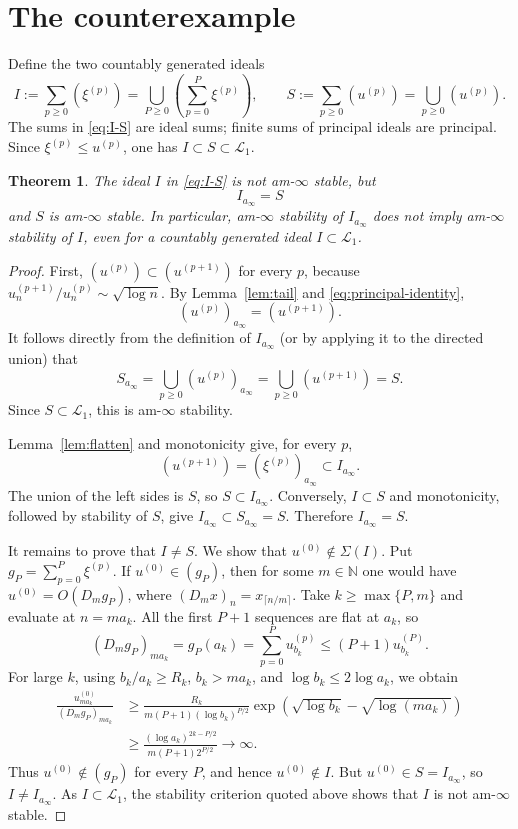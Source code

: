 \documentclass[11pt]{article}
\newtheorem{theorem}{Theorem}
\newcommand{\N}{\mathbb N}
\begin{document}
\section{The counterexample}

Define the two countably generated ideals
\begin{equation}\label{eq:I-S}
 I:=\sum_{p\ge0}(\xi^{(p)})
   =\bigcup_{P\ge0}\left(\sum_{p=0}^{P}\xi^{(p)}\right),
 \qquad
 S:=\sum_{p\ge0}(u^{(p)})=\bigcup_{p\ge0}(u^{(p)}).
\end{equation}
The sums in \eqref{eq:I-S} are ideal sums; finite sums of principal ideals
are principal.  Since $\xi^{(p)}\le u^{(p)}$, one has $I\subset S\subset
\mathcal L_1$.

\begin{theorem}\label{thm:counterexample}
The ideal $I$ in \eqref{eq:I-S} is not am-$\infty$ stable, but
\[
                         I_{a_\infty}=S
\]
and $S$ is am-$\infty$ stable.  In particular, am-$\infty$ stability of
$I_{a_\infty}$ does not imply am-$\infty$ stability of $I$, even for a
countably generated ideal $I\subset\mathcal L_1$.
\end{theorem}

\begin{proof}
First, $(u^{(p)})\subset(u^{(p+1)})$ for every $p$, because
$u^{(p+1)}_n/u^{(p)}_n\sim\sqrt{\log n}$.  By
Lemma~\ref{lem:tail} and \eqref{eq:principal-identity},
\[
             (u^{(p)})_{a_\infty}=(u^{(p+1)}).
\]
It follows directly from the definition of $I_{a_\infty}$ (or by applying it
to the directed union) that
\[
                  S_{a_\infty}
 =\bigcup_{p\ge0}(u^{(p)})_{a_\infty}
 =\bigcup_{p\ge0}(u^{(p+1)})=S.
\]
Since $S\subset\mathcal L_1$, this is am-$\infty$ stability.

Lemma~\ref{lem:flatten} and monotonicity give, for every $p$,
\[
 (u^{(p+1)})=(\xi^{(p)})_{a_\infty}\subset I_{a_\infty}.
\]
The union of the left sides is $S$, so $S\subset I_{a_\infty}$.  Conversely,
$I\subset S$ and monotonicity, followed by stability of $S$, give
$I_{a_\infty}\subset S_{a_\infty}=S$.  Therefore $I_{a_\infty}=S$.

It remains to prove that $I\ne S$.  We show that $u^{(0)}\notin\Sigma(I)$.
Put $g_P=\sum_{p=0}^{P}\xi^{(p)}$.  If $u^{(0)}\in(g_P)$, then for some
$m\in\N$ one would have $u^{(0)}=O(D_mg_P)$, where
$(D_mx)_n=x_{\lceil n/m\rceil}$.  Take $k\ge\max\{P,m\}$ and evaluate at
$n=ma_k$.  All the first $P+1$ sequences are flat at $a_k$, so
\[
 (D_mg_P)_{ma_k}=g_P(a_k)=\sum_{p=0}^{P}u^{(p)}_{b_k}
 \le(P+1)u^{(P)}_{b_k}.
\]
For large $k$, using $b_k/a_k\ge R_k$, $b_k>ma_k$, and
$\log b_k\le2\log a_k$, we obtain
\begin{align*}
 \frac{u^{(0)}_{ma_k}}{(D_mg_P)_{ma_k}}
 &\ge
 \frac{R_k}{m(P+1)(\log b_k)^{P/2}}
 \exp\!\left(\sqrt{\log b_k}-\sqrt{\log(ma_k)}\right)\\
 &\ge
 \frac{(\log a_k)^{2k-P/2}}
      {m(P+1)2^{P/2}}\longrightarrow\infty.
\end{align*}
Thus $u^{(0)}\notin(g_P)$ for every $P$, and hence
$u^{(0)}\notin I$.  But $u^{(0)}\in S=I_{a_\infty}$, so $I\ne I_{a_\infty}$.
As $I\subset\mathcal L_1$, the stability criterion quoted above shows that
$I$ is not am-$\infty$ stable.
\end{proof}
\end{document}
